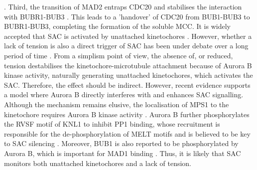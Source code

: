 \citep{Mapelli2007MADSignaling, Mapelli2007TheCheckpoint, DeAntoni2005TheCheckpoint}. Third, the transition of MAD2 entraps CDC20 and stabilises the interaction with BUBR1-BUB3 \citep{Piano2021CDC20Complex, Lara-Gonzalez2021AKinetochores, Fischer2022JuxtapositionAssembly, Alfieri2016MolecularCheckpoint}. This leads to a 'handover' of CDC20 from BUB1-BUB3 to BUBR1-BUB3, completing the formation of the soluble MCC. It is widely accepted that SAC is activated by unattached kinetochores \citep{London2014, Musacchio2011SpindleDecade, Lara-Gonzalez2021SpindleKinetochores, Musacchio2015TheDynamics}. However, whether a lack of tension is also a direct trigger of SAC has been under debate over a long period of time \citep{McVey2021AuroraSegregation, McAinsh2023PrinciplesSignalling}. From a simplism point of view, the absence of, or reduced, tension destabilises the kinetochore-microtubule attachment because of Aurora B kinase activity, naturally generating unattached kinetochores, which activates the SAC. Therefore, the effect should be indirect. However, recent evidence supports a model where Aurora B directly interferes with and enhances SAC signalling. Although the mechanism remains elusive, the localisation of MPS1 to the kinetochore requires Aurora B kinase activity \citep{Ji2015KinetochoreNdc80C, Saurin2011AuroraMitosis, Nijenhuis2013AB}. Aurora B further phosphorylates the RVSF motif of KNL1 to inhibit PP1 binding, whose recruitment is responsible for the de-phosphorylation of MELT motifs and is believed to be key to SAC silencing \citep{Liu2010RegulatedKinase, Roy2019}. Moreover, BUB1 is also reported to be phosphorylated by Aurora B, which is important for MAD1 binding \citep{Roy2022AuroraSignaling}. Thus, it is likely that SAC monitors both unattached kinetochores and a lack of tension. 

